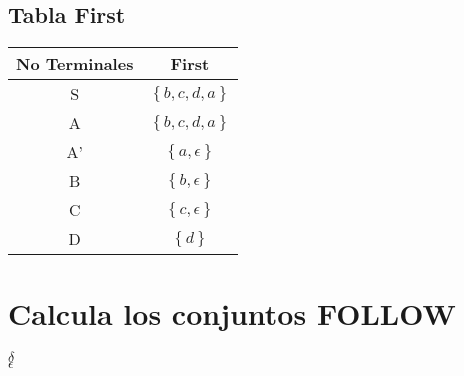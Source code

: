 \documentclass[12pt]{article}
\begin{document}
\subsection{Tabla First}
\begin{center}
\begin{tabular}{|c| c| } 
 \hline
 No Terminales & First \\ [0.5ex] 
 \hline
 S & $\left \{b, c, d, a  \right \}$ \\ 
 \hline
 A & $\left \{b, c, d, a  \right \}$  \\
 \hline
 A' & $\left \{a, \epsilon  \right \}$  \\
 \hline
 B & $\left \{b, \epsilon  \right \}$\\
 \hline
 C & $\left \{c, \epsilon  \right \}$ \\ 
 \hline
 D & $\left \{d  \right \}$ \\ 
 \hline
\end{tabular}
\end{center}

\section{Calcula los conjuntos FOLLOW }
$\delta$\\
$\epsilon$
\end{document}

